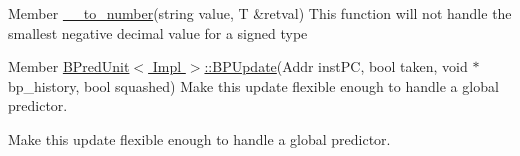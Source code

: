 \label{todo__todo000005}
\hypertarget{todo__todo000005}{}
 
\begin{DoxyDescription}
\item[Member \hyperlink{str_8cc_a62ee5dab740541c091921011e05068c7}{\_\-\_\-to\_\-number}(string value, T \&retval) ]This function will not handle the smallest negative decimal value for a signed type 
\end{DoxyDescription}

\label{todo__todo000001}
\hypertarget{todo__todo000001}{}
 
\begin{DoxyDescription}
\item[Member \hyperlink{classBPredUnit_a35c57ae0661f1d5dd2169e919741d47b}{BPredUnit$<$ Impl $>$::BPUpdate}(Addr instPC, bool taken, void $\ast$bp\_\-history, bool squashed) ]Make this update flexible enough to handle a global predictor. 

Make this update flexible enough to handle a global predictor. 
\end{DoxyDescription}
